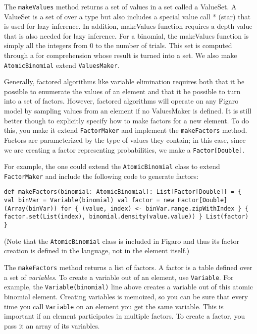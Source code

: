 The \texttt{makeValues} method returns a set of values in a set called a ValueSet. A ValueSet is a set of over a type but also includes a special value call * (star) that is used for lazy inference. In addition, makeValues function requires a depth value that is also needed for lazy inference. For a binomial, the makeValues function is simply all the integers from 0 to the number of trials. This set is computed through a for comprehension whose result is turned into a set. We also make \texttt{AtomicBinomial} extend \texttt{ValuesMaker}.

Generally, factored algorithms like variable elimination requires both that it be possible to enumerate the values of an element and that it be possible to turn into a set of factors. However, factored algorithms will operate on any Figaro model by sampling values from an element if no ValuesMaker is defined. It is still better though to explicitly specify how to make factors for a new element. To do this, you make it
extend \texttt{FactorMaker} and implement the \texttt{makeFactors} method. Factors are parameterized by the type of values they contain; in this case, since we are creating a factor representing probabilities, we make a \texttt{Factor[Double]}.

For example, the one could extend the \texttt{AtomicBinomial} class to extend \texttt{FactorMaker} and include the following code to generate factors:

\begin{flushleft}
\texttt{def makeFactors(binomial: AtomicBinomial): List[Factor[Double]] = \{
\newline \tab val binVar = Variable(binomial)
\newline \tab val factor = new Factor[Double](Array(binVar))
\newline \tab for \{ (value, index) <- binVar.range.zipWithIndex \} \{
\newline \tab factor.set(List(index), binomial.density(value.value))
\newline \} 
\newline \tab List(factor)
\newline \}
}
\end{flushleft}
(Note that the \texttt{AtomicBinomial} class is included in Figaro and thus its factor creation is defined in the language, not in the element itself.)

The \texttt{makeFactors} method returns a list of factors. A factor is a table defined over a set of \emph{variables}. To create a variable out of an element, use \texttt{Variable}. For example, the \texttt{Variable(binomial)} line above creates a variable out of this atomic binomial element. Creating variables is memoized, so you can be sure that every time you call \texttt{Variable} on an element you get the same variable. This is important if an element participates in multiple factors. To create a factor, you pass it an array of its variables.

